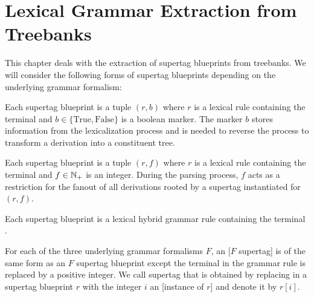 \documentclass[../document.tex]{subfiles}
\begin{document}
    \chapter{Lexical Grammar Extraction from Treebanks}\label{sec:extraction}
    This chapter deals with the extraction of supertag blueprints from treebanks.
    We will consider the following forms of supertag blueprints depending on the underlying grammar formalism:
    \begin{compactenum}
        \item
            Each  supertag blueprint is a tuple \((r, b)\) where \(r\) is a lexical  rule containing the terminal \wildcard{} and \(b \in \{\text{True}, \text{False}\}\) is a boolean marker.
            The marker \(b\) stores information from the lexicalization process and is needed to reverse the process to transform a derivation into a constituent tree.
        \item
            Each  supertag blueprint is a tuple \((r, f)\) where \(r\) is a lexical  rule containing the terminal \wildcard{} and \(f \in \mathbb{N}_+\) is an integer.
            During the parsing process, \(f\) acts as a restriction for the fanout of all derivations rooted by a supertag instantiated for \((r,f)\).
        \item Each  supertag blueprint is a lexical hybrid grammar rule containing the terminal \wildcard{}.
    \end{compactenum}
    For each of the three underlying grammar formalisms \(F\), an [\(F\) supertag] is of the same form as an \(F\) supertag blueprint except the terminal \wildcard{} in the grammar rule is replaced by a positive integer.
    We call supertag that is obtained by replacing \wildcard{} in a supertag blueprint \(r\) with the integer \(i\) an [instance of \(r\)] and denote it by \(r[i]\).
\end{document}
